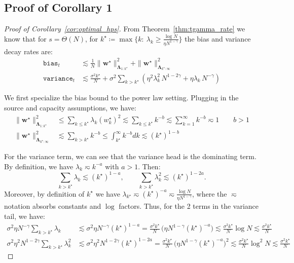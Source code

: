 \documentclass{article}
\def\w{{\mathbf{w}}}
\def\bias{\mathtt{bias}}
\def\variance{\mathtt{variance}}
\def\LLambda{{\mathbf{\Lambda}}}
\def\w{{\mathbf{w}}}
\def\bias{\mathtt{bias}}
\def\variance{\mathtt{variance}}
\def\LLambda{{\mathbf{\Lambda}}}
\theoremstyle{plain}
\def\w{{\mathbf{w}}}
\def\bias{\mathtt{bias}}
\def\variance{\mathtt{variance}}
\def\LLambda{{\mathbf{\Lambda}}}
\begin{document}
\subsection{Proof of Corollary 1}
\begin{proof}[Proof of Corollary~\ref{cor:optimal_hps}]
    From Theorem~\ref{thm:tgamma_rate} we know that for $s = \Theta(N)$, for $k^\star
    \coloneqq
    \max\Big\{k:\ \lambda_k \ge \tfrac{\log N}{\eta N^{1-\gamma}}\Big\}$ the bias and variance decay rates are:
    \begin{align*}
        \bias_t &\lesssim \frac{1}{N} \|\w^\star\|_{\LLambda_{1:k^\star}}^2 + \|\w^\star\|_{\LLambda_{k^\star:\infty}}^2\\
        \variance_t &\lesssim \frac{\sigma^2 k^\star}{N}
        + \sigma^2
        \sum_{k>k^\star}
        \left(
            \eta^2 \lambda_k^2\, N^{1-2\gamma}
            + \eta \lambda_k\, N^{-\gamma}
        \right)
    \end{align*}

    We first specialize the bias bound to the power law setting. Plugging in the source and capacity assumptions, we have:
    \begin{align*}
        \|\w^\star\|_{\LLambda_{1:k^\star}}^2 &\leq \sum_{k\leq k^\star} \lambda_k (w_k^\star)^2 \lesssim \sum_{k\leq k^\star} k^{-b} \lesssim \sum_{k = 1}^\infty k^{-b} \eqsim 1 \qquad b > 1\\
        \|\w^\star\|_{\LLambda_{k^\star:\infty}}^2 &\lesssim \sum_{k>k^\star} k^{-b} \leq \int_{k^\star}^\infty k^{-b} dk\lesssim (k^\star)^{1-b}
    \end{align*}

    For the variance term, we can see that the variance head is the dominating term. By definition, we have  $\lambda_k \eqsim k^{-a}$ with $a>1$. Then:
\[
\sum_{k>k^\star}\lambda_k \lesssim (k^\star)^{1-a},
\qquad
\sum_{k>k^\star}\lambda_k^2 \lesssim (k^\star)^{1-2a}.
\]
Moreover, by definition of $k^\star$ we have $\lambda_{k^\star}\eqsim (k^\star)^{-a}\eqsim \frac{\log{N}}{\eta N^{1-\gamma}}$, where the $\eqsim$ notation absorbs constants and $\log$ factors. Thus, for the 2 terms in the variance tail, we have:
\begin{align*}
\sigma^2\eta N^{-\gamma}\sum_{k>k^\star}\lambda_k
&\lesssim
\sigma^2\eta N^{-\gamma}(k^\star)^{1-a}
=
\frac{\sigma^2 k^\star}{N}\,\Big(\eta N^{1-\gamma}(k^\star)^{-a}\Big)
\lesssim
\frac{\sigma^2 k^\star}{N}\log{N} \lesssim \frac{\sigma^2 k^\star}{N}\\
\sigma^2\eta^2 N^{1-2\gamma}\sum_{k>k^\star}\lambda_k^2
&\lesssim
\sigma^2\eta^2 N^{1-2\gamma}(k^\star)^{1-2a}
=
\frac{\sigma^2 k^\star}{N}\,\Big(\eta N^{1-\gamma}(k^\star)^{-a}\Big)^2
\lesssim
\frac{\sigma^2 k^\star}{N} \log^{2}{N} \lesssim \frac{\sigma^2 k^\star}{N}
\end{align*}


\end{proof}
\end{document}
